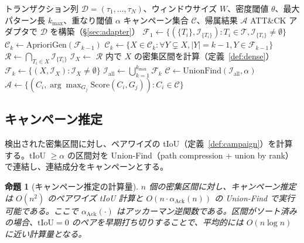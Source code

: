 \documentclass[11pt]{article}
\newtheorem{proposition}{命題}
\begin{document}
\begin{algorithm}[t]
\caption{DenseATTACKMiner}
\label{alg:dense}
\begin{algorithmic}[1]
\Require トランザクション列 $\mathcal{D} = (\tau_1, \ldots, \tau_N)$、ウィンドウサイズ $W$、密度閾値 $\theta$、最大パターン長 $k_{\max}$、重なり閾値 $\alpha$
\Ensure キャンペーン集合 $\mathcal{C}$、帰属結果 $\mathcal{A}$
\State ATT\&CK アダプタで $\mathcal{D}$ を構築（\S\ref{sec:adapter}）
\State $\mathcal{F}_1 \gets \{(\{T_i\}, \mathcal{I}_{\{T_i\}}) : T_i \in \mathcal{T}, \mathcal{I}_{\{T_i\}} \neq \emptyset\}$ 
    \State $\mathcal{C}_k \gets \mathrm{AprioriGen}(\mathcal{F}_{k-1})$ 
    \State $\mathcal{C}_k \gets \{X \in \mathcal{C}_k : \forall Y \subsetneq X, |Y| = k-1, Y \in \mathcal{F}_{k-1}\}$ 
        \State $\mathcal{R} \gets \bigcap_{T_i \in X} \mathcal{I}_{\{T_i\}}$ 
        \State $\mathcal{I}_X \gets$ $\mathcal{R}$ 内で $X$ の密集区間を計算（定義~\ref{def:dense}）
    \EndFor
    \State $\mathcal{F}_k \gets \{(X, \mathcal{I}_X) : \mathcal{I}_X \neq \emptyset\}$
\EndFor
\State $\mathcal{I}_{\mathrm{all}} \gets \bigcup_{k=1}^{k_{\max}} \mathcal{F}_k$
\State $\mathcal{C} \gets \mathrm{UnionFind}(\mathcal{I}_{\mathrm{all}}, \alpha)$ 
\State $\mathcal{A} \gets \{(C_i, \arg\max_{G_j} \mathrm{Score}(C_i, G_j)) : C_i \in \mathcal{C}\}$ 
\end{algorithmic}
\end{algorithm}

\subsection{キャンペーン推定}

検出された密集区間に対し、ペアワイズの tIoU（定義~\ref{def:campaign}）を計算する。tIoU $\geq \alpha$ の区間対を Union-Find（path compression + union by rank）で連結し、連結成分をキャンペーンとする。

\begin{proposition}[キャンペーン推定の計算量]\label{prop:campaign_complexity}
$n$ 個の密集区間に対し、キャンペーン推定は $O(n^2)$ のペアワイズ tIoU 計算と $O(n \cdot \alpha_{\mathrm{Ack}}(n))$ の Union-Find で実行可能である。ここで $\alpha_{\mathrm{Ack}}(\cdot)$ はアッカーマン逆関数である。区間がソート済みの場合、$\mathrm{tIoU} = 0$ のペアを早期打ち切りすることで、平均的には $O(n \log n)$ に近い計算量となる。
\end{proposition}
\end{document}
